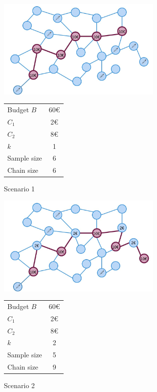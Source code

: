 \documentclass[12pt]{report}
\begin{document}
\begin{figure}[h]
  \begin{minipage}[c]{0.67\textwidth}
    \includegraphics[width=0.72\textwidth]{skipping1}
  \end{minipage}\hfill
  \begin{minipage}[c]{0.3\textwidth}
    
		\caption{Scenario 1}
		
		\begin{tabular}{l c}
  			Budget $B$ & 60\euro \\
 		    $C_1$ & 2\euro \\
  		    $C_2$ & 8\euro \\
  		    $k$   & 1 \\
  		    Sample size  & 6 \\
		    Chain size   & 6 \\
		\end{tabular}	
		
    
  \end{minipage}
\end{figure}

\begin{figure}[h]
  \begin{minipage}[c]{0.67\textwidth}
    \includegraphics[width=0.72\textwidth]{skipping2}
  \end{minipage}\hfill
  \begin{minipage}[c]{0.3\textwidth}
    \caption{Scenario 2}
		
		\begin{tabular}{l c}
  			Budget $B$ & 60\euro \\
 		    $C_1$ & 2\euro \\
  		    $C_2$ & 8\euro \\
  		    $k$   & 2 \\
  		    Sample size  & 5 \\
		    Chain size   & 9 \\
		\end{tabular}	
  \end{minipage}
\end{figure}
\end{document}
